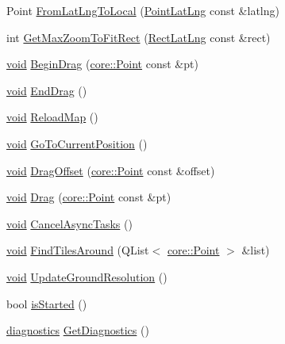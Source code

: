 \begin{DoxyCompactItemize}
\item 
\-Point \hyperlink{group___o_p_map_widget_ga8a2cc04c6bd69c306eaebe3df205f919}{\-From\-Lat\-Lng\-To\-Local} (\hyperlink{structinternals_1_1_point_lat_lng}{\-Point\-Lat\-Lng} const \&latlng)
\item 
int \hyperlink{group___o_p_map_widget_gaa75d239e869570eef0224e4e5654bd75}{\-Get\-Max\-Zoom\-To\-Fit\-Rect} (\hyperlink{structinternals_1_1_rect_lat_lng}{\-Rect\-Lat\-Lng} const \&rect)
\item 
\hyperlink{group___u_a_v_objects_plugin_ga444cf2ff3f0ecbe028adce838d373f5c}{void} \hyperlink{group___o_p_map_widget_ga1255054a69438d905b49b903627aef03}{\-Begin\-Drag} (\hyperlink{structcore_1_1_point}{core\-::\-Point} const \&pt)
\item 
\hyperlink{group___u_a_v_objects_plugin_ga444cf2ff3f0ecbe028adce838d373f5c}{void} \hyperlink{group___o_p_map_widget_ga47086f4344e201cc216384fb3acec854}{\-End\-Drag} ()
\item 
\hyperlink{group___u_a_v_objects_plugin_ga444cf2ff3f0ecbe028adce838d373f5c}{void} \hyperlink{group___o_p_map_widget_ga0ca3f365c1668226a6788084d56a6c1d}{\-Reload\-Map} ()
\item 
\hyperlink{group___u_a_v_objects_plugin_ga444cf2ff3f0ecbe028adce838d373f5c}{void} \hyperlink{group___o_p_map_widget_ga868496601dff669c0a6844a27f41e5c7}{\-Go\-To\-Current\-Position} ()
\item 
\hyperlink{group___u_a_v_objects_plugin_ga444cf2ff3f0ecbe028adce838d373f5c}{void} \hyperlink{group___o_p_map_widget_ga87303856077d440b36aa4b53a5103d64}{\-Drag\-Offset} (\hyperlink{structcore_1_1_point}{core\-::\-Point} const \&offset)
\item 
\hyperlink{group___u_a_v_objects_plugin_ga444cf2ff3f0ecbe028adce838d373f5c}{void} \hyperlink{group___o_p_map_widget_gaf302579c11ad5c2448be76ada0b19bf5}{\-Drag} (\hyperlink{structcore_1_1_point}{core\-::\-Point} const \&pt)
\item 
\hyperlink{group___u_a_v_objects_plugin_ga444cf2ff3f0ecbe028adce838d373f5c}{void} \hyperlink{group___o_p_map_widget_gab37e2ea3b3bb0c794bb9abdf84ac5b5d}{\-Cancel\-Async\-Tasks} ()
\item 
\hyperlink{group___u_a_v_objects_plugin_ga444cf2ff3f0ecbe028adce838d373f5c}{void} \hyperlink{group___o_p_map_widget_ga862fd51a3d103dc955ca08f20abe57b0}{\-Find\-Tiles\-Around} (\-Q\-List$<$ \hyperlink{structcore_1_1_point}{core\-::\-Point} $>$ \&list)
\item 
\hyperlink{group___u_a_v_objects_plugin_ga444cf2ff3f0ecbe028adce838d373f5c}{void} \hyperlink{group___o_p_map_widget_gaafdb82148ca58b162ba477a8e1d520c1}{\-Update\-Ground\-Resolution} ()
\item 
bool \hyperlink{group___o_p_map_widget_ga19e259470609023b204a70c4345ff54c}{is\-Started} ()
\item 
\hyperlink{structdiagnostics}{diagnostics} \hyperlink{group___o_p_map_widget_ga32889efb3fd780403d2005980b0a7dfc}{\-Get\-Diagnostics} ()
\end{DoxyCompactItemize}
